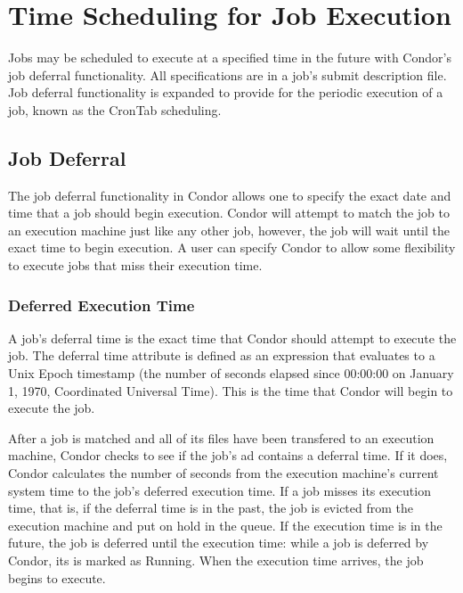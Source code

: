 \section{Time Scheduling for Job Execution}
\label{sec:Job-Executetime-Scheduling}

Jobs may be scheduled to execute at a specified time in the future
with Condor's job deferral functionality.
All specifications are in a job's submit description file.
Job deferral functionality is expanded to provide for the
periodic execution of a job, known as the CronTab scheduling.

\subsection{Job Deferral}
\label{sec:JobDeferral}

The job deferral functionality in Condor allows one to specify
the exact date and time that a job should begin execution.
Condor will attempt to match the job to an execution machine
just like any other job,
however, the job will wait until the exact time to begin execution.
A user can specify Condor to allow some flexibility to execute jobs
that miss their execution time.

\subsubsection{Deferred Execution Time}
\label{sec:Jobdeferral-Deferraltime}
A job's deferral time is the exact time that Condor should attempt
to execute the job.
The deferral time attribute is defined as an expression
that evaluates to a Unix Epoch timestamp
(the number of seconds elapsed since 00:00:00 on January 1, 1970,
Coordinated Universal Time).
This is the time that Condor will begin to execute the job.

After a job is matched and all of its files have been transfered
to an execution machine,
Condor checks to see if the job's ad contains a deferral time.
If it does,
Condor calculates the number of seconds from the execution
machine's current system time to the job's deferred execution time.
If a job misses its execution time,
that is, if the deferral time is in the past,
the job is evicted from the execution machine and put on hold in the queue.
If the execution time is in the future,
the job is deferred until the execution time:
while a job is deferred by Condor,
its  is marked as Running.
When the execution time arrives, the job begins to execute.

